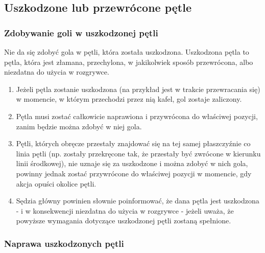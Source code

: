 \documentclass[12pt]{article}
\begin{document}
\subsection{Uszkodzone lub przewrócone pętle}

\subsubsection{Zdobywanie goli w uszkodzonej pętli}
Nie da się zdobyć
gola w pętli, która została uszkodzona. Uszkodzona pętla to pętla, która
jest złamana, przechylona, w jakikolwiek sposób przewrócona, albo
niezdatna do użycia w rozgrywce.

\begin{enumerate}
	\item
	      Jeżeli pętla zostanie uszkodzona (na przykład jest w trakcie
	      przewracania się) w momencie, w którym przechodzi przez nią kafel, gol
	      zostaje zaliczony.
	\item
	      Pętla musi zostać całkowicie naprawiona i przywrócona do właściwej
	      pozycji, zanim będzie można zdobyć w niej gola.
	\item
	      Pętli, których obręcze przestały znajdować się na tej samej
	      płaszczyźnie co linia pętli (np. zostały przekręcone tak, że przestały
	      być zwrócone w kierunku linii środkowej), nie uznaje się za uszkodzone
	      i można zdobyć w nich gola, powinny jednak zostać przywrócone do
	      właściwej pozycji w momencie, gdy akcja opuści okolice pętli.
	\item
	      Sędzia główny powinien słownie poinformować, że dana pętla jest
	      uszkodzona - i w konsekwencji niezdatna do użycia w rozgrywce - jeżeli
	      uważa, że powyższe wymagania dotyczące uszkodzonej pętli zostaną
	      spełnione.
\end{enumerate}

\subsubsection{Naprawa uszkodzonych pętli}
\end{document}
